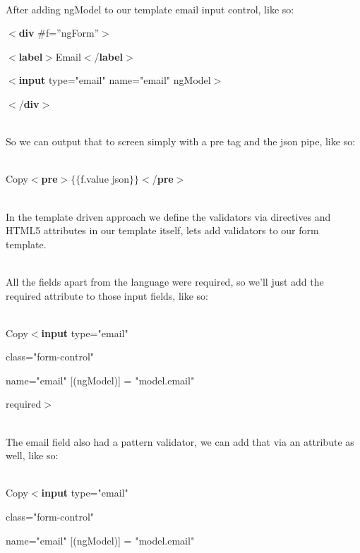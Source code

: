 \documentclass{article}
\begin{document}
\noindent \\  After adding ngModel to our template email input control, like so:   

\noindent $\mathrm{<}$\textbf{div} \#f=''ngForm''$\mathrm{>}$

\noindent $\mathrm{<}$\textbf{label}$\mathrm{>}$Email$\mathrm{<}$/\textbf{label}$\mathrm{>}$

\noindent $\mathrm{<}$\textbf{input} type="email" name="email" ngModel$\mathrm{>}$

\noindent $\mathrm{<}$/\textbf{div}$\mathrm{>}$ 



\noindent \\  So we can output that to screen simply with a pre tag and the json pipe, like so: 

  

\noindent \\  Copy$\mathrm{<}$\textbf{pre}$\mathrm{>}$$\mathrm{\{}$$\mathrm{\{}$f.value {\textbar} json$\mathrm{\}}$$\mathrm{\}}$$\mathrm{<}$/\textbf{pre}$\mathrm{>}$ 

\noindent 
\newpage
{}

\noindent 

\noindent \\  In the template driven approach we define the validators via directives and HTML5 attributes in our template itself, lets add validators to our form template. 

\noindent \\  All the fields apart from the language were required, so we'll just add the required attribute to those input fields, like so: 

  

\noindent \\  Copy$\mathrm{<}$\textbf{input} type="email" 

class="form-control" 

name="email" [(ngModel)] = "model.email" 

required$\mathrm{>}$ 

\noindent \\  The email field also had a pattern validator, we can add that via an attribute as well, like so:  

\noindent \\  Copy$\mathrm{<}$\textbf{input} type="email" 

\noindent class="form-control" 

\noindent name="email" [(ngModel)] = "model.email" 
\end{document}
